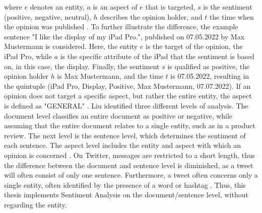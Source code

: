 where $e$ denotes an entity, $a$ is an aspect of $e$ that is targeted, $s$ is the sentiment (positive, negative, neutral), $h$ describes the opinion holder, and $t$ the time when the opinion was published \cite{liu_2015}. To further illustrate the difference, the example sentence "I like the display of my iPad Pro.", published on 07.05.2022 by Max Mustermann is considered. Here, the entity $e$ is the target of the opinion, the iPad Pro, while $a$ is the specific attribute of the iPad that the sentiment is based on, in this case, the display. Finally, the sentiment $s$ is qualified as positive, the opinion holder $h$ is Max Mustermann, and the time $t$ is 07.05.2022, resulting in the quintuple (iPad Pro, Display, Positive, Max Mustermann, 07.07.2022). If an opinion does not target a specific aspect, but rather the entire entity, the aspect is defined as "GENERAL" \cite{liu_2015}. Liu identified three different levels of analysis. The document level classifies an entire document as positive or negative, while assuming that the entire document relates to a single entity, such as in a product review. The next level is the sentence level, which determines the sentiment of each sentence. The aspect level includes the entity and aspect with which an opinion is concerned \cite{liu_2015}. On Twitter, messages are restricted to a short length, thus the difference between the document and sentence level is diminished, as a tweet will often consist of only one sentence. Furthermore, a tweet often concerns only a single entity, often identified by the presence of a word or hashtag \cite{DBLP:journals/csur/GiachanouC16}. Thus, this thesis implements Sentiment Analysis on the document/sentence level, without regarding the entity.

